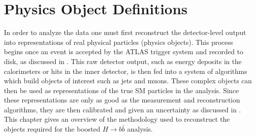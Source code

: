 \chapter{Physics Object Definitions} \label{chap:objects}

In order to analyze the data one must first reconstruct the detector-level
output into representations of real physical particles (physics objects).  This
process begins once an event is accepted by the ATLAS trigger system and
recorded to disk, as discussed in .  This raw detector
output, such as energy deposits in the calorimeters or hits in the inner
detector, is then fed into a system of algorithms which build objects of
interest such as jets and muons.  These complex objects can then be used as
representations of the true SM particles in the analysis.  Since these
representations are only as good as the measurement and reconstruction
algorithms, they are then calibrated and given an uncertainty as discussed in
. This chapter gives an overview of the methodology used
to reconstruct the objects required for the boosted $H \rightarrow b\bar{b}$
analysis.




